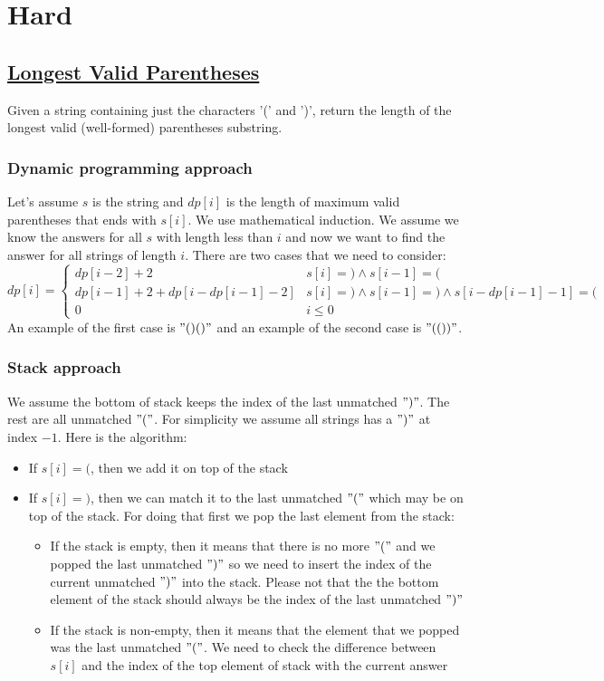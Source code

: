 \documentclass{book}
\begin{document}
	\section{Hard}
	\subsection{\href{https://leetcode.com/problems/longest-valid-parentheses/description/}{Longest Valid Parentheses}}
	Given a string containing just the characters '(' and ')', return the length of the longest valid (well-formed) parentheses substring.
	\subsubsection{Dynamic programming approach}
	Let's assume $s$ is the string and $dp[i]$ is the length of maximum valid parentheses that ends with $s[i]$. We use mathematical induction. We assume we know the answers for all $s$ with length less than $i$ and now we want to find the answer for all strings of length $i$. There are two cases that we need to consider:
	\begin{equation*}
		dp[i] = \begin{cases}
			dp[i - 2] + 2 & s[i] = \text{)} \land s[i - 1] = \text{(} \\
			dp[i - 1] + 2 + dp[i - dp[i - 1] - 2] & s[i] = \text{)} \land s[i - 1] = \text{)} \land s[i - dp[i - 1] - 1] = \text{(} \\
			0 & i \le 0
		\end{cases}
	\end{equation*}
	An example of the first case is $"()()"$ and an example of the second case is $"(())"$.
	\subsubsection{Stack approach}
	We assume the bottom of stack keeps the index of the last unmatched $")"$. The rest are all unmatched $"("$. For simplicity we assume all strings has a $")"$ at index $-1$. Here is the algorithm:
	\begin{itemize}
		\item If $s[i] = ($, then we add it on top of the stack
		\item If $s[i] = )$, then we can match it to the last unmatched $"("$ which may be on top of the stack. For doing that first we pop the last element from the stack:
		\begin{itemize}
			\item If the stack is empty, then it means that there is no more $"("$ and we popped the last unmatched $")"$ so we need to insert the index of the current unmatched $")"$ into the stack. Please not that the the bottom element of the stack should always be the index of the last unmatched $")"$
			\item If the stack is non-empty, then it means that the element that we popped was the last unmatched $"("$. We need to check the difference between $s[i]$ and the index of the top element of stack with the current answer
		\end{itemize}
	\end{itemize}
\end{document}
